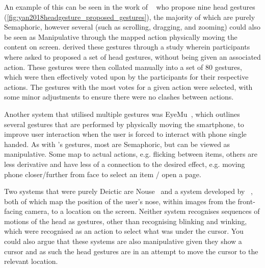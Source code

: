 An example of this can be seen in the work of \citeauthor{yan2018headgesture}~\cite{yan2018headgesture} who propose nine head gestures (\autoref{fig:yan2018headgesture_proposed_gestures}), the majority of which are purely Semaphoric, however several (such as scrolling, dragging, and zooming) could also be seen as Manipulative through the mapped action physically moving the content on screen.
\citeauthor{yan2018headgesture} derived these gestures through a study wherein participants where asked to proposed a set of head gestures, without being given an associated action. These gestures were then collated manually into a set of 80 gestures, which were then effectively voted upon by the participants for their respective actions.
The gestures with the most votes for a given action were selected, with some minor adjustments to ensure there were no clashes between actions.

Another system that utilised multiple gestures was EyeMu~\cite{kong2021eyemu}, which outlines several gestures that are performed by physically moving the smartphone, to improve user interaction when the user is forced to interact with phone single handed.
As with \citeauthor{yan2018headgesture}'s gestures, most are Semaphoric, but can be viewed as manipulative.
Some map to actual actions, e.g. flicking between items, others are less derivative and have less of a connection to the desired effect, e.g. moving phone closer/further from face to select an item / open a page.

Two systems that were purely Deictic are Nouse~\cite{gorodnichy2004nouse} and a system developed by \citeauthor{varona2008hands}~\cite{varona2008hands}, both of which map the position of the user's nose, within images from the front-facing camera, to a location on the screen.
Neither system recognises sequences of motions of the head as gestures, other than recognising blinking and winking, which were recognised as an action to select what was under the cursor. 
You could also argue that these systems are also manipulative given they show a cursor and as such the head gestures are in an attempt to move the cursor to the relevant location.

